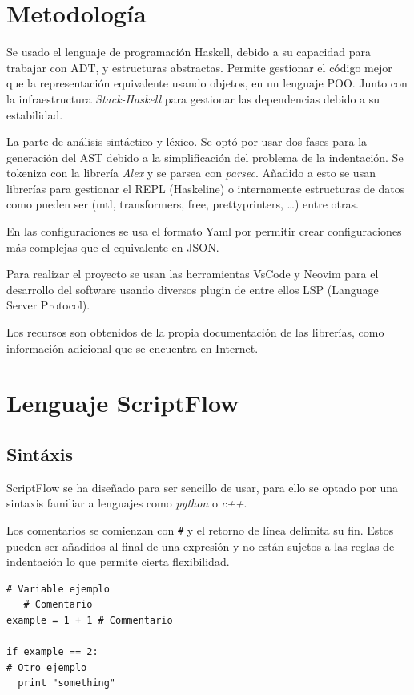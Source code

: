 \documentclass[11pt]{article}
\begin{document}
\section{Metodología}
\label{sec:org0799017}

Se usado el lenguaje de programación Haskell, debido a su capacidad para trabajar con ADT, y estructuras abstractas. Permite gestionar
el código mejor que la representación equivalente usando objetos, en un lenguaje POO. Junto con la infraestructura \emph{Stack-Haskell} para
gestionar las dependencias debido a su estabilidad.

La parte de análisis sintáctico y léxico. Se optó por usar dos fases para la generación del AST
debido a la simplificación del problema de la indentación. Se tokeniza con la librería \emph{Alex} y se parsea con \emph{parsec}.
Añadido a esto se usan librerías para gestionar el REPL (Haskeline) o internamente estructuras de datos como pueden ser (mtl, transformers, free, prettyprinters, \ldots{})
entre otras.

En las configuraciones se usa el formato Yaml por permitir crear configuraciones más complejas que el equivalente en JSON.

Para realizar el proyecto se usan las herramientas VsCode y Neovim para el desarrollo del software usando diversos
plugin de entre ellos LSP (Language Server Protocol).

Los recursos son obtenidos de la propia documentación de las librerías, como información adicional que se encuentra en Internet.

\section{Lenguaje ScriptFlow}
\label{sec:org1cfe43f}

\subsection{Sintáxis}
\label{sec:org1b4565a}

ScriptFlow se ha diseñado para ser sencillo de usar, para ello se optado por una sintaxis familiar a lenguajes como
\emph{python} o \emph{c++}.

Los comentarios se comienzan con \texttt{\#} y el retorno de línea delimita su fin. Estos pueden ser añadidos al final de una expresión y no están sujetos a las reglas de indentación
lo que permite cierta flexibilidad.

\begin{verbatim}
# Variable ejemplo
   # Comentario
example = 1 + 1 # Commentario

if example == 2:
# Otro ejemplo
  print "something"
\end{verbatim}
\end{document}
